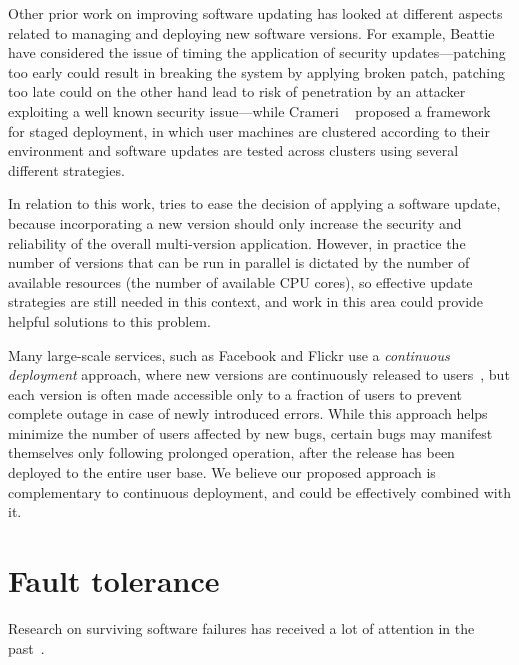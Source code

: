 Other prior work on improving software updating has looked at different aspects
related to managing and deploying new software versions.  For example, Beattie
\etal~\cite{beattie2002} have considered the issue of timing the application of
security updates---patching too early could result in breaking the system by
applying broken patch, patching too late could on the other hand lead to risk
of penetration by an attacker exploiting a well known security issue---while
Crameri \etal~\cite{crameri:updates} proposed a framework for staged
deployment, in which user machines are clustered according to their environment
and software updates are tested across clusters using several different
strategies.

In relation to this work, \mx tries to ease the decision of applying a software
update, because incorporating a new version should only increase the security
and reliability of the overall multi-version application.  However, in practice
the number of versions that can be run in parallel is dictated by the number of
available resources (\eg the number of available CPU cores), so effective
update strategies are still needed in this context, and work in this area could
provide helpful solutions to this problem.


Many large-scale services, such as Facebook and Flickr use a {\it
continuous deployment} approach, where new versions are continuously
released to users~\cite{johnson2009,flickr}, but each version is often
made accessible only to a fraction of users to prevent complete outage
in case of newly introduced errors.  While this approach helps
minimize the number of users affected by new bugs, certain bugs may
manifest themselves only following prolonged operation, after the
release has been deployed to the entire user base.  We believe our
proposed approach is complementary to continuous deployment, and could
be effectively combined with it.

\section{Fault tolerance}

Research on surviving software failures has received a lot of
attention in the
past~\cite{rx,compl-schedules11,fo,exec-trans06,vigilante,clearview,microreboots}.

